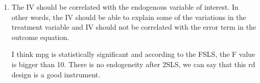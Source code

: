 \documentclass{article}
\begin{document}
\begin{enumerate}
\vspace{0.5cm}
\item 

\vspace{0.5cm}

The IV should be correlated with the endogenous variable of interest. In other words, the IV should be able to explain some of the variations in the treatment variable and IV should not be correlated with the error term in the outcome equation.

I think mpg is statistically significant and according to the FSLS, the F value is bigger than 10. There is no endogeneity after 2SLS, we can say that this rd design is a good instrument.  
 

\end{enumerate}
\end{document}
